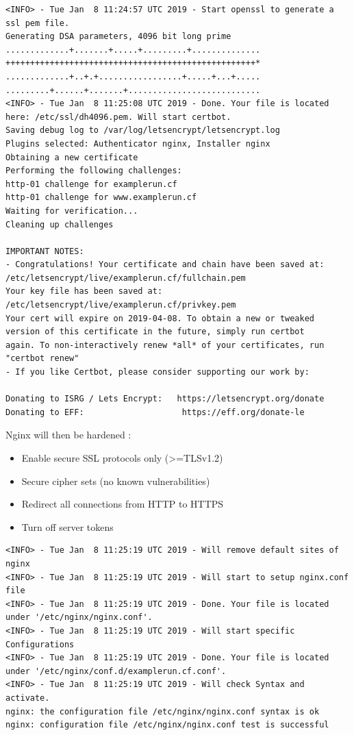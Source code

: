 \begin{lstlisting}
<INFO> - Tue Jan  8 11:24:57 UTC 2019 - Start openssl to generate a ssl pem file.
Generating DSA parameters, 4096 bit long prime
.............+.......+.....+.........+..............
+++++++++++++++++++++++++++++++++++++++++++++++++++*
.............+..+.+.................+.....+...+.....
.........+......+.......+...........................
<INFO> - Tue Jan  8 11:25:08 UTC 2019 - Done. Your file is located here: /etc/ssl/dh4096.pem. Will start certbot.
Saving debug log to /var/log/letsencrypt/letsencrypt.log
Plugins selected: Authenticator nginx, Installer nginx
Obtaining a new certificate
Performing the following challenges:
http-01 challenge for examplerun.cf
http-01 challenge for www.examplerun.cf
Waiting for verification...
Cleaning up challenges

IMPORTANT NOTES:
- Congratulations! Your certificate and chain have been saved at:
/etc/letsencrypt/live/examplerun.cf/fullchain.pem
Your key file has been saved at:
/etc/letsencrypt/live/examplerun.cf/privkey.pem
Your cert will expire on 2019-04-08. To obtain a new or tweaked
version of this certificate in the future, simply run certbot
again. To non-interactively renew *all* of your certificates, run
"certbot renew"
- If you like Certbot, please consider supporting our work by:

Donating to ISRG / Lets Encrypt:   https://letsencrypt.org/donate
Donating to EFF:                    https://eff.org/donate-le
\end{lstlisting}

Nginx will then be hardened \cite{nginx-ssl}:
\begin{itemize}
    \item{Enable secure SSL protocols only (\textgreater=TLSv1.2)}
    \item{Secure cipher sets (no known vulnerabilities)}
    \item{Redirect all connections from HTTP to HTTPS}
    \item{Turn off server tokens}
\end{itemize}

\begin{lstlisting}
<INFO> - Tue Jan  8 11:25:19 UTC 2019 - Will remove default sites of nginx
<INFO> - Tue Jan  8 11:25:19 UTC 2019 - Will start to setup nginx.conf file
<INFO> - Tue Jan  8 11:25:19 UTC 2019 - Done. Your file is located under '/etc/nginx/nginx.conf'.
<INFO> - Tue Jan  8 11:25:19 UTC 2019 - Will start specific Configurations
<INFO> - Tue Jan  8 11:25:19 UTC 2019 - Done. Your file is located under '/etc/nginx/conf.d/examplerun.cf.conf'.
<INFO> - Tue Jan  8 11:25:19 UTC 2019 - Will check Syntax and activate.
nginx: the configuration file /etc/nginx/nginx.conf syntax is ok
nginx: configuration file /etc/nginx/nginx.conf test is successful
\end{lstlisting}

